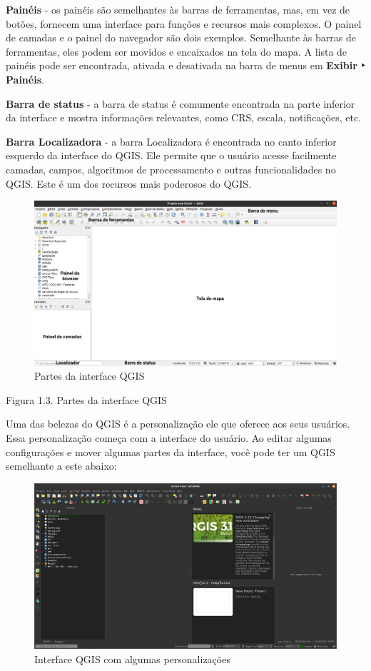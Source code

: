 \documentclass[
]{book}
\begin{document}
\textbf{Painéis} - os painéis são semelhantes às barras de ferramentas, mas, em vez de botões, fornecem uma interface para funções e recursos mais complexos. O painel de camadas e o painel do navegador são dois exemplos. Semelhante às barras de ferramentas, eles podem ser movidos e encaixados na tela do mapa. A lista de painéis pode ser encontrada, ativada e desativada na barra de menus em \textbf{Exibir ‣ Painéis}.

\textbf{Barra de status} - a barra de status é comumente encontrada na parte inferior da interface e mostra informações relevantes, como CRS, escala, notificações, etc.

\textbf{Barra Localizadora} - a barra Localizadora é encontrada no canto inferior esquerdo da interface do QGIS. Ele permite que o usuário acesse facilmente camadas, campos, algoritmos de processamento e outras funcionalidades no QGIS. Este é um dos recursos mais poderosos do QGIS.

\begin{figure}
\centering
\includegraphics{media/modulo1/qgis-interface-parts.png}
\caption{Partes da interface QGIS}
\end{figure}

Figura 1.3. Partes da interface QGIS

Uma das belezas do QGIS é a personalização ele que oferece aos seus usuários. Essa personalização começa com a interface do usuário. Ao editar algumas configurações e mover algumas partes da interface, você pode ter um QGIS semelhante a este abaixo:

\begin{figure}
\centering
\includegraphics{media/modulo1/qgis-interface-custom.png}
\caption{Interface QGIS com algumas personalizações}
\end{figure}
\end{document}
